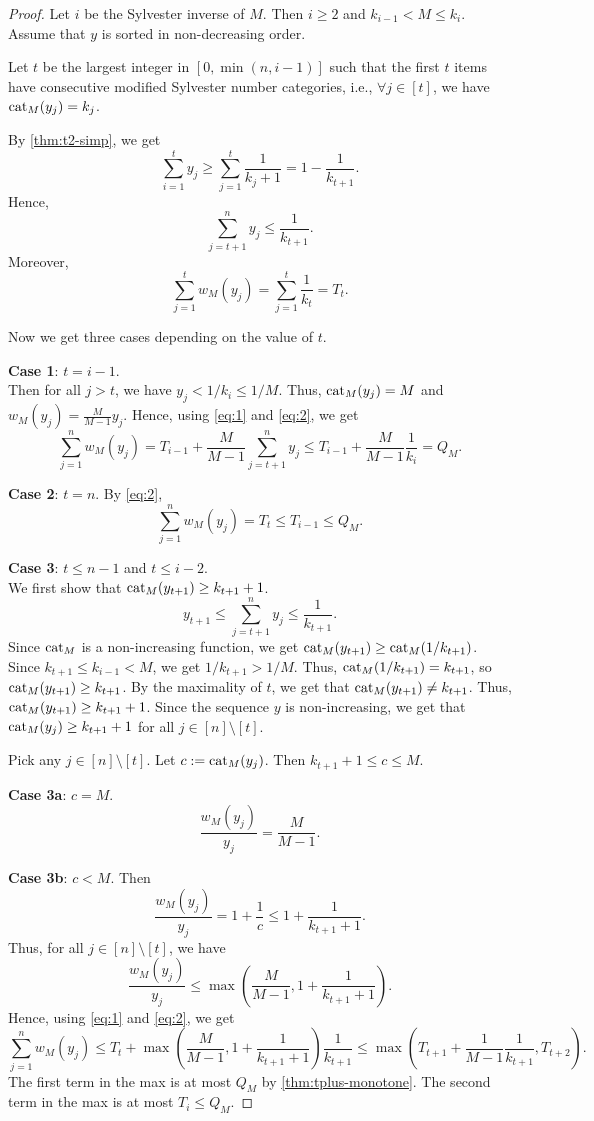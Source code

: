 \thmHarmonicWeightBound*
\begin{proof}
Let $i$ be the Sylvester inverse of $M$.
Then $i \ge 2$ and $k_{i-1} < M \le k_i$.
Assume \wLoG{} that $y$ is sorted in non-decreasing order.

Let $t$ be the largest integer in $[0, \min(n, i-1)]$ such that
the first $t$ items have consecutive modified Sylvester number categories, i.e.,
$\forall j \in [t]$, we have $\operatorname{cat}_M(y_j) = k_j$.

By \cref{thm:t2-simp}, we get
\[ \sum_{i=1}^t y_j \ge \sum_{j=1}^t \frac{1}{k_j+1} = 1 - \frac{1}{k_{t+1}}. \]
Hence,
\begin{equation}
\label{eq:1}
\sum_{j=t+1}^n y_j \le \frac{1}{k_{t+1}}.
\end{equation}
Moreover,
\begin{equation}
\label{eq:2}
\sum_{j=1}^t w_M(y_j) = \sum_{j=1}^t \frac{1}{k_t} = T_t.
\end{equation}

Now we get three cases depending on the value of $t$.

\textbf{Case 1}: $t = i-1$.
\\ Then for all $j > t$, we have $y_j < 1/k_i \le 1/M$.
Thus, $\operatorname{cat}_M(y_j) = M$ and $w_M(y_j) = \frac{M}{M-1} y_j$.
Hence, using \eqref{eq:1} and \eqref{eq:2}, we get
\[ \sum_{j=1}^n w_M(y_j) = T_{i-1} + \frac{M}{M-1}\sum_{j=t+1}^n y_j
    \le T_{i-1} + \frac{M}{M-1}\frac{1}{k_i} = Q_M. \]

\textbf{Case 2}: $t = n$. By \cref{eq:2},
\[ \sum_{j=1}^n w_M(y_j) = T_t \le T_{i-1} \le Q_M. \]

\textbf{Case 3}: $t \le n-1$ and $t \le i-2$.
\\ We first show that $\operatorname{cat}_M(y_{t+1}) \ge k_{t+1}+1$.
\[ y_{t+1} \le \sum_{j=t+1}^n y_j \le \frac{1}{k_{t+1}}. \]
Since $\operatorname{cat}_M$ is a non-increasing function, we get $\operatorname{cat}_M(y_{t+1}) \ge \operatorname{cat}_M(1/k_{t+1})$.
Since $k_{t+1} \le k_{i-1} < M$, we get $1/k_{t+1} > 1/M$.
Thus, $\operatorname{cat}_M(1/k_{t+1}) = k_{t+1}$, so $\operatorname{cat}_M(y_{t+1}) \ge k_{t+1}$.
By the maximality of $t$, we get that $\operatorname{cat}_M(y_{t+1}) \neq k_{t+1}$.
Thus, $\operatorname{cat}_M(y_{t+1}) \ge k_{t+1}+1$.
Since the sequence $y$ is non-increasing, we get that
$\operatorname{cat}_M(y_j) \ge k_{t+1}+1$ for all $j \in [n] \setminus [t]$.

Pick any $j \in [n] \setminus [t]$. Let $c := \operatorname{cat}_M(y_j)$.
Then $k_{t+1}+1 \le c \le M$.

\textbf{Case 3a}: $c = M$.
\[ \frac{w_M(y_j)}{y_j} = \frac{M}{M-1}. \]

\textbf{Case 3b}: $c < M$. Then
\[ \frac{w_M(y_j)}{y_j} = 1 + \frac{1}{c} \le 1 + \frac{1}{k_{t+1}+1}. \]
Thus, for all $j \in [n] \setminus [t]$, we have
\[ \frac{w_M(y_j)}{y_j} \le \max\left(\frac{M}{M-1}, 1 + \frac{1}{k_{t+1}+1}\right). \]
Hence, using \eqref{eq:1} and \eqref{eq:2}, we get
\[ \sum_{j=1}^n w_M(y_j) \le T_t + \max\left(\frac{M}{M-1}, 1 + \frac{1}{k_{t+1}+1}\right)\frac{1}{k_{t+1}}
    \le \max\left(T_{t+1} + \frac{1}{M-1}\frac{1}{k_{t+1}}, T_{t+2}\right). \]
The first term in the max is at most $Q_M$ by \cref{thm:tplus-monotone}.
The second term in the max is at most $T_i \le Q_M$.
\end{proof}
